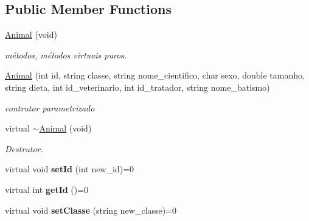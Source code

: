 \subsection*{Public Member Functions}
\begin{DoxyCompactItemize}
\item 
\mbox{\label{class_animal_a02157454829b85ad5cac5bf0a64d2eea}} 
\mbox{\hyperlink{class_animal_a02157454829b85ad5cac5bf0a64d2eea}{Animal}} (void)
\begin{DoxyCompactList}\small\item\em métodos, métodos virtuais puros. \end{DoxyCompactList}\item 
\mbox{\label{class_animal_a9a4c1ee42529276ffd15b09594d3862c}} 
\mbox{\hyperlink{class_animal_a9a4c1ee42529276ffd15b09594d3862c}{Animal}} (int id, string classe, string nome\+\_\+cientifico, char sexo, double tamanho, string dieta, int id\+\_\+veterinario, int id\+\_\+tratador, string nome\+\_\+batismo)
\begin{DoxyCompactList}\small\item\em contrutor parametrizado \end{DoxyCompactList}\item 
\mbox{\label{class_animal_a1b9b978632a09ea4b336d2b61aec86dc}} 
virtual \mbox{\hyperlink{class_animal_a1b9b978632a09ea4b336d2b61aec86dc}{$\sim$\+Animal}} (void)
\begin{DoxyCompactList}\small\item\em Destrutor. \end{DoxyCompactList}\item 
\mbox{\label{class_animal_af1c492f9d4e1319c9870f113efd94f09}} 
virtual void {\bfseries set\+Id} (int new\+\_\+id)=0
\item 
\mbox{\label{class_animal_a78fec43619218f7c6929f572a1be5ad1}} 
virtual int {\bfseries get\+Id} ()=0
\item 
\mbox{\label{class_animal_a3555a7f1ce6fa2d14118f17594b37bb7}} 
virtual void {\bfseries set\+Classe} (string new\+\_\+classe)=0
\item 
\mbox{\label{class_animal_ac4e9906dae6e273e2d3c07d4833799e9}} 

\end{DoxyCompactItemize}
